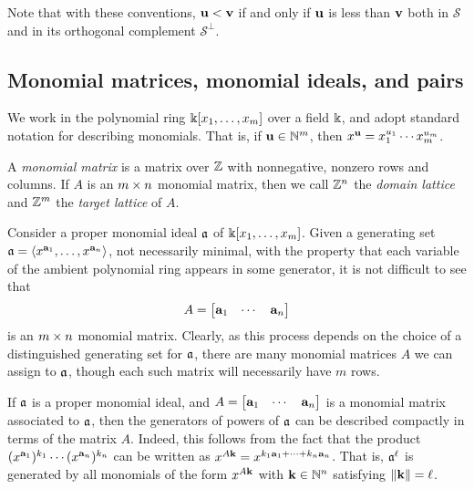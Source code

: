 \documentclass[11pt]{amsart}
\begin{document}
Note that with these conventions, $\mathbf{u} < \mathbf{v}$ if and only if $\mathbf{u}$ is less than $\mathbf{v}$ both in $\mathcal{S}$ and in its orthogonal complement $\mathcal{S}^\perp$.

\subsection{Monomial matrices, monomial ideals, and pairs}
\label{monomial newton preliminaries: ss}

We work in the polynomial ring $\Bbbk[x_1, \ldots, x_m]$ over a field $\Bbbk$, and adopt standard notation for describing monomials.  That is, if $\mathbf{u} \in \mathbb{N}^m$, then $x^{\mathbf{u}} = x_1^{u_1} \cdots x_m^{u_m}$.

\begin{definition}
\label{monomial matrix: D}
A \emph{monomial matrix} is a matrix over $\mathbb{Z}$ with nonnegative, nonzero rows and columns.
If $A$ is an $m \times n$ monomial matrix, then we call $\mathbb{Z}^n$ the \emph{domain lattice} and $\mathbb{Z}^m$ the \emph{target lattice} of $A$. 
\end{definition}

\begin{remark}
\label{monomial matrix ideal: R}  Consider a proper monomial ideal $\mathfrak{a}$ of $\Bbbk[x_1, \ldots, x_{m}]$.  Given a generating set $\mathfrak{a} = \langle x^{\mathbf{a}_1}, \ldots, x^{\mathbf{a}_n} \rangle$, not necessarily minimal, with the property that each variable of the ambient polynomial ring appears in some generator, it is not difficult to see that \[A= \begin{bmatrix} \mathbf{a}_1 & \cdots & \mathbf{a}_n \end{bmatrix}\] is an  $m \times n$ monomial matrix.  Clearly, as this process depends on the choice of a distinguished generating set for $\mathfrak{a}$, there are many monomial matrices $A$ we can assign to $\mathfrak{a}$, though each such matrix will necessarily have $m$ rows.
\end{remark}

\begin{remark}
   \label{generators-via-exponent-matrix: R}  If $\mathfrak{a}$ is a proper monomial ideal, and $A= \begin{bmatrix} \mathbf{a}_1 & \cdots & \mathbf{a}_n \end{bmatrix}$ is a monomial matrix associated to $\mathfrak{a}$, then the generators of powers of $\mathfrak{a}$ can be described compactly in terms of the matrix $A$.
   Indeed, this follows from the fact that the product $(x^{\mathbf{a}_1})^{k_1} \cdots (x^{\mathbf{a}_n})^{k_n}$ can be written as $x^{A \mathbf{k}} = x^{k_1 \mathbf{a}_1 + \cdots + k_n \mathbf{a}_n}$.
   That is, $\mathfrak{a}^\ell$ is generated by all monomials of the form $x^{A \mathbf{k}}$ with $\mathbf{k} \in \mathbb{N}^n$ satisfying $\| \mathbf{k} \| = \ell$.
%
\end{remark}
\end{document}
